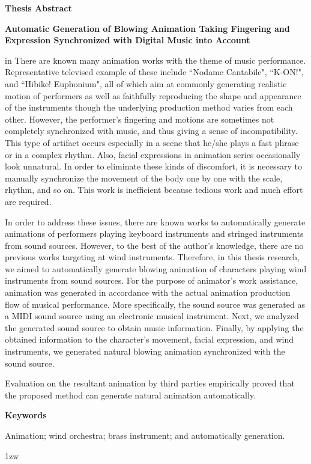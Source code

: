 \begin{center}
{\bf {\large Thesis Abstract}}

\vspace{2ex}

{\bf {\large Automatic Generation of Blowing Animation Taking Fingering and Expression Synchronized with Digital Music into Account}}
\end{center}

\vspace{3ex}

 in
There are known many animation works with the theme of music performance. Representative televised example of these include ``Nodame Cantabile", ``K-ON!", and ``Hibike! Euphonium", all of which aim at commonly generating realistic motion of performers as well as faithfully reproducing the shape and appearance of the instruments though the underlying production method varies from each other. However, the performer's fingering and motions are sometimes not completely synchronized with music, and thus giving a sense of incompatibility. This type of artifact occurs especially in a scene that he/she plays a fast phrase or in a complex rhythm. Also, facial expressions in animation series occasionally look unnatural. In order to eliminate these kinds of discomfort, it is necessary to manually synchronize the movement of the body one by one with the scale, rhythm, and so on. This work is inefficient because tedious work and much effort are required.\par
%
In order to address these issues, there are known works to automatically generate animations of performers playing keyboard instruments and stringed instruments from sound sources. However, to the best of the author's knowledge, there are no previous works targeting at wind instruments. Therefore, in this thesis research, we aimed to automatically generate blowing animation of characters playing wind instruments from sound sources. For the purpose of animator's work assistance, animation was generated in accordance with the actual animation production flow of musical performance. More specifically, the sound source was generated as a MIDI sound source using an electronic musical instrument. Next, we analyzed the generated sound source to obtain music information. Finally, by applying the obtained information to the character's movement, facial expression, and wind instruments, we generated natural blowing animation synchronized with the sound source.\par
%
Evaluation on the resultant animation by third parties empirically proved that the proposed method can generate natural animation automatically.
\vspace{4ex}

\noindent
{\bf Keywords}

\noindent
Animation; wind orchestra; brass instrument; and automatically generation.

\parindent 1zw